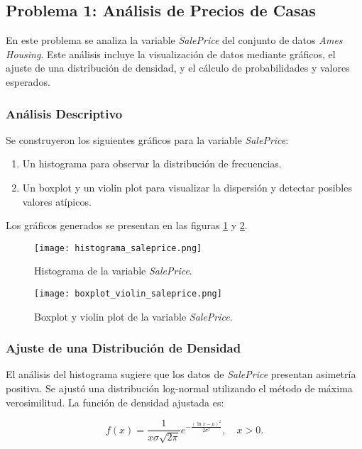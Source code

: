 \documentclass[12pt]{article}
\begin{document}
\subsection{Problema 1: Análisis de Precios de Casas}
En este problema se analiza la variable \textit{SalePrice} del conjunto de datos \textit{Ames Housing}. Este análisis incluye la visualización de datos mediante gráficos, el ajuste de una distribución de densidad, y el cálculo de probabilidades y valores esperados.

\subsubsection{Análisis Descriptivo}
Se construyeron los siguientes gráficos para la variable \textit{SalePrice}:
\begin{enumerate}
    \item Un histograma para observar la distribución de frecuencias.
    \item Un boxplot y un violin plot para visualizar la dispersión y detectar posibles valores atípicos.
\end{enumerate}

Los gráficos generados se presentan en las figuras \ref{fig:histograma} y \ref{fig:boxplot_violin}.

\begin{figure}[H]
    \centering
    \texttt{[image: histograma\_saleprice.png]}
    \caption{Histograma de la variable \textit{SalePrice}.}
    \label{fig:histograma}
\end{figure}

\begin{figure}[H]
    \centering
    \texttt{[image: boxplot\_violin\_saleprice.png]}
    \caption{Boxplot y violin plot de la variable \textit{SalePrice}.}
    \label{fig:boxplot_violin}
\end{figure}

\subsubsection{Ajuste de una Distribución de Densidad}
El análisis del histograma sugiere que los datos de \textit{SalePrice} presentan asimetría positiva. Se ajustó una distribución log-normal utilizando el método de máxima verosimilitud. La función de densidad ajustada es:

\[
f(x) = \frac{1}{x \sigma \sqrt{2\pi}} e^{-\frac{(\ln x - \mu)^2}{2\sigma^2}}, \quad x > 0.
\]
\end{document}
